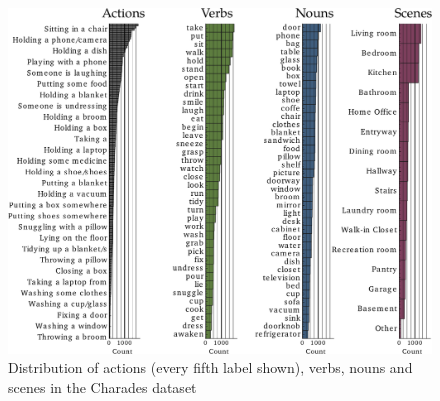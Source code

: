 \begin{figure}[H]
    \centering
    \includegraphics[width=\textwidth]{img_datasets/charades_statistics}
    \caption{Distribution of actions (every fifth label shown), verbs, nouns and scenes in the Charades dataset \cite{caba_heilbron_activitynet:_2015}}
    \label{fig:charades_statistics}
\end{figure}
